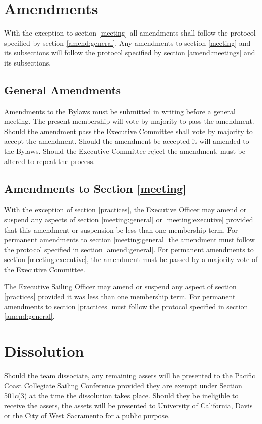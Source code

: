 \documentclass[12pt,titlepage,letter]{article}
\begin{document}
\section{Amendments \label{amendments}}
With the exception to section \ref{meeting} all amendments shall follow the protocol specified by section \ref{amend:general}. Any amendments to section \ref{meeting} and its subsections will follow the protocol specified by section \ref{amend:meetings} and its subsections.

\subsection{General Amendments \label{amend:general}}
Amendments to the Bylaws must be submitted in writing before a general meeting. The present membership will vote by majority to pass the amendment. Should the amendment pass the Executive Committee shall vote by majority to accept the amendment. Should the amendment be accepted it will amended to the Bylaws. Should the Executive Committee reject the amendment, must be altered to repeat the process.

\subsection{Amendments to Section \ref{meeting} \label{amend:meetings}}
With the exception of section \ref{practices}, the Executive Officer may amend or suspend any aspects of section \ref{meeting:general} or \ref{meeting:executive} provided that this  amendment or suspension be less than one membership term. For permanent amendments to section \ref{meeting:general} the amendment must follow the protocol specified in section \ref{amend:general}. For permanent amendments to section \ref{meeting:executive}, the amendment must be passed by a majority vote of the Executive Committee.

The Executive Sailing Officer may amend or suspend any aspect of section \ref{practices} provided it was less than one membership term. For permanent amendments to section \ref{practices} must follow the protocol specified in section \ref{amend:general}.

\section{Dissolution \label{Dissolution}}
Should the team dissociate, any remaining assets will be presented to the Pacific Coast Collegiate Sailing Conference provided they are exempt under Section 501c(3) at the time the dissolution takes place. Should they be ineligible to receive the assets, the assets will be presented to University of California, Davis or the City of West Sacramento for a public purpose.
\end{document}
